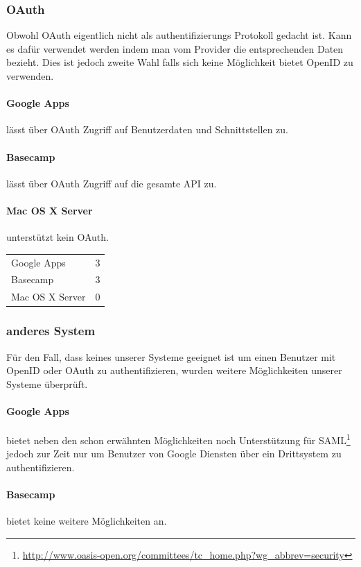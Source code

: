 \subsubsection{OAuth}
\label{ssub:Bewertung OAuth}
Obwohl OAuth eigentlich nicht als authentifizierungs Protokoll gedacht ist. Kann es dafür verwendet werden indem man vom Provider die entsprechenden Daten bezieht. Dies ist jedoch zweite Wahl falls sich keine Möglichkeit bietet OpenID zu verwenden.
\paragraph{Google Apps}
\label{par:2.2Google Apps}
lässt über OAuth Zugriff auf Benutzerdaten und Schnittstellen zu.
\paragraph{Basecamp}
\label{par:2.2Basecamp}
lässt über OAuth Zugriff auf die gesamte API zu.
\paragraph{Mac OS X Server}
\label{par:2.2Mac OS X Server}
unterstützt kein OAuth.

\begin{tabular}{lc}
Google Apps & 3\\
Basecamp & 3\\
Mac OS X Server & 0\\
\end{tabular}

\subsubsection{anderes System}
\label{ssub:anderes System}
Für den Fall, dass keines unserer Systeme geeignet ist um einen Benutzer mit OpenID oder OAuth zu authentifizieren, wurden weitere Möglichkeiten unserer Systeme überprüft.
\paragraph{Google Apps}
\label{par:2.3Google Apps}
bietet neben den schon erwähnten Möglichkeiten noch Unterstützung für SAML\footnote{\url{http://www.oasis-open.org/committees/tc_home.php?wg_abbrev=security}} jedoch zur Zeit nur um Benutzer von Google Diensten über ein Drittsystem zu authentifizieren.
\paragraph{Basecamp}
\label{par:2.3Basecamp}
bietet keine weitere Möglichkeiten an.
